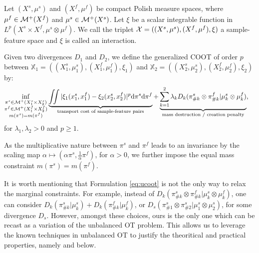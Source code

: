 \begin{definition}
Let $(X^s, \mu^s)$ and $(X^f, \mu^f)$ be compact Polish measure spaces, where $\mu^f \in \mathcal M^+(X^f)$
and $\mu^s \in \mathcal M^+(X^s)$. Let $\xi$ be a scalar integrable function in
$L^p(X^s \times X^f, \mu^s \otimes \mu^f)$. We call the triplet
$\mathcal X = ((X^s, \mu^s), (X^f, \mu^f), \xi)$ a sample-feature space and $\xi$ is called an interaction.
\end{definition}
%
\begin{definition}
\label{def:ucoot}
Given two divergences $D_1$ and $D_2$, we define the generalized COOT of order $p$
between $\mathbb{X}_1 = ((X_1^s, \mu_1^s), (X_1^f, \mu_1^f), \xi_1)$ and
$\mathbb{X}_2 = ((X_2^s, \mu_2^s), (X_2^f, \mu_2^f), \xi_2)$ by:
\begin{equation}
\label{eq:ucoot}
  \begin{split}
  \inf_{\substack{\pi^s \in \mathcal M^+(X_1^s \times X_2^s) \\
  \pi^f \in \mathcal M^+(X_1^f \times X_2^f) \\ m(\pi^s) = m(\pi^f)}}
  &\underbrace{\iint |\xi_1(x_1^s, x_1^f) - \xi_2(x_2^s, x_2^f)|^p
  \mathrm d\pi^s\mathrm d \pi^f}_{\text{transport cost of sample-feature pairs}}
  + \underbrace{\sum_{k=1}^2\lambda_k D_k(\pi^s_{\#k} \otimes \pi^f_{\#k} |
  \mu^s_k \otimes \mu^f_k)}_{\text{mass destruction / creation penalty}},
  \end{split}
\end{equation}
for $\lambda_1, \lambda_2 >0$ and $p \geq 1$.
\end{definition}
As the multiplicative nature between $\pi^s$ and $\pi^f$ leads to an invariance by the scaling map
$\alpha \mapsto (\alpha \pi^s, \frac{1}{\alpha}\pi^f)$, for $\alpha > 0$,
we further impose the equal mass constraint $m(\pi^s) = m(\pi^f)$.

It is worth mentioning that Formulation \eqref{eq:ucoot} is not the only way to
relax the marginal constraints. For example, instead of
$D_k(\pi^s_{\#k} \otimes \pi^f_{\#k} | \mu^s_k \otimes \mu^f_k)$,
one can consider $D_k(\pi^s_{\#k} | \mu^s_k) + D_k( \pi^f_{\#k} | \mu^f_k)$,
or $D_s(\pi^s_{\#1} \otimes \pi^s_{\#2} | \mu^s_1 \otimes \mu^s_2)$,
for some divergence $D_s$. However, amongst these choices,
ours is the only one which can be recast as a variation of the unbalanced OT problem.
This allows us to leverage the known techniques in unbalanced OT to justify
the theoritical and practical properties, namely 
and  below.


